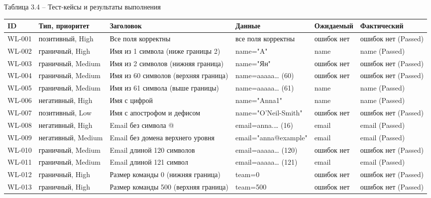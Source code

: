 \documentclass[a4paper,14pt]{extarticle}
\begin{document}
\noindent Таблица 3.4 – Тест-кейсы и результаты выполнения\par\nopagebreak
\begin{longtable}{|>{\raggedright\arraybackslash}p{}|>{\raggedright\arraybackslash}p{}|>{\raggedright\arraybackslash}p{}|>{\raggedright\arraybackslash}p{}|>{\raggedright\arraybackslash}p{}|>{\raggedright\arraybackslash}p{}|}
\hline
ID & Тип, приоритет & Заголовок & Данные & Ожидаемый & Фактический \\ \hline
\endhead
WL-001 & позитивный, High & Все поля корректны & все поля корректны & ошибок нет & ошибок нет (Passed) \\ \hline
WL-002 & граничный, High & Имя из 1 символа (ниже границы 2) & name="A" & name & name (Passed) \\ \hline
WL-003 & граничный, Medium & Имя из 2 символов (нижняя граница) & name="Ян" & ошибок нет & ошибок нет (Passed) \\ \hline
WL-004 & граничный, Medium & Имя из 60 символов (верхняя граница) & name=aaaaa… (60) & ошибок нет & ошибок нет (Passed) \\ \hline
WL-005 & граничный, Medium & Имя из 61 символа (выше границы) & name=aaaaa… (61) & name & name (Passed) \\ \hline
WL-006 & негативный, High & Имя с цифрой & name="Anna1" & name & name (Passed) \\ \hline
WL-007 & позитивный, Low & Имя с апострофом и дефисом & name="O'Neil-Smith" & ошибок нет & ошибок нет (Passed) \\ \hline
WL-008 & негативный, High & Email без символа @ & email=anna.… (16) & email & email (Passed) \\ \hline
WL-009 & негативный, Medium & Email без домена верхнего уровня & email="anna@example" & email & email (Passed) \\ \hline
WL-010 & граничный, Medium & Email длиной 120 символов & email=aaaaa… (120) & ошибок нет & ошибок нет (Passed) \\ \hline
WL-011 & граничный, Medium & Email длиной 121 символ & email=aaaaa… (121) & email & email (Passed) \\ \hline
WL-012 & граничный, High & Размер команды 0 (нижняя граница) & team=0 & ошибок нет & ошибок нет (Passed) \\ \hline
WL-013 & граничный, High & Размер команды 500 (верхняя граница) & team=500 & ошибок нет & ошибок нет (Passed) \\ \hline

\end{longtable}
\end{document}
